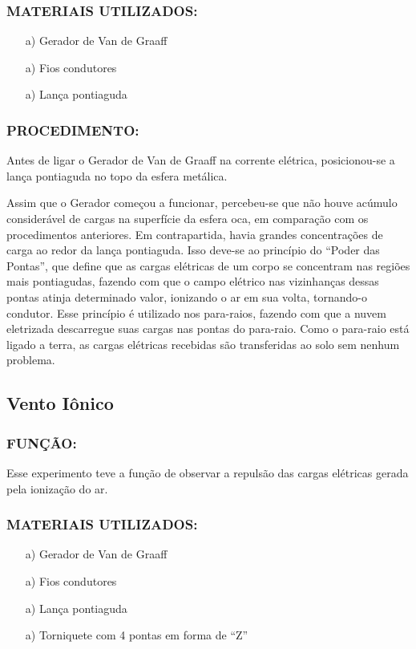 \subsubsection{MATERIAIS UTILIZADOS: }
\begin{itemize}
    \item[a)] Gerador de Van de Graaff
    \item[a)] Fios condutores
    \item[a)] Lança pontiaguda
\end{itemize}

\subsubsection{PROCEDIMENTO:}
Antes de ligar o Gerador de Van de Graaff na corrente elétrica, posicionou-se a lança pontiaguda no topo da esfera metálica.

\noindent Assim que o Gerador começou a funcionar, percebeu-se que não houve acúmulo considerável de cargas na superfície da esfera oca, em comparação com os procedimentos anteriores. Em contrapartida, havia grandes concentrações de carga ao redor da lança pontiaguda. Isso deve-se ao princípio do “Poder das Pontas”, que define que as cargas elétricas de um corpo se concentram nas regiões mais pontiagudas, fazendo com que o campo elétrico nas vizinhanças 
dessas pontas atinja determinado valor, ionizando o ar em sua volta, tornando-o condutor. Esse princípio é utilizado nos para-raios, fazendo com que a nuvem eletrizada descarregue suas cargas nas pontas do para-raio. Como o para-raio está ligado a terra, as cargas elétricas recebidas são transferidas ao solo sem nenhum problema. 

\subsection{Vento Iônico}
\subsubsection{FUNÇÃO:}
Esse experimento teve a função de observar a repulsão das cargas elétricas gerada pela ionização 
do ar.
\subsubsection{MATERIAIS UTILIZADOS: }
\begin{itemize}
    \item[a)] Gerador de Van de Graaff
    \item[a)] Fios condutores
    \item[a)] Lança pontiaguda
    \item[a)] Torniquete com 4 pontas em forma de “Z”
    \end{itemize}
    

